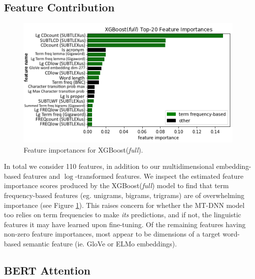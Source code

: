 \documentclass[11pt,a4paper]{article}
\begin{document}
\subsection{Feature Contribution}

\begin{figure}
  \centering
  \includegraphics[scale=0.45]{xgboost_feature_importances.png}
  \captionsetup{justification=centering}
  \caption{\label{fig:xgboost_feature_importance} Feature importances for XGBoost(\textit{full}).}
\end{figure}

In total we consider 110 features, in addition to our multidimensional embedding-based features and $\log$-transformed features. We inspect the estimated feature importance scores produced by the XGBoost(\textit{full}) model to find that term frequency-based features (eg. unigrams, bigrams, trigrams) are of overwhelming importance (see Figure \ref{fig:xgboost_feature_importance}). This raises concern for whether the MT-DNN model too relies on term frequencies to make \textit{its} predictions, and if not, the linguistic features it may have learned upon fine-tuning. Of the remaining features having non-zero feature importances, most appear to be dimensions of a target word-based semantic feature (ie. GloVe or ELMo embeddings).

\subsection{BERT Attention}
\label{sec:bert_attention}
\end{document}
